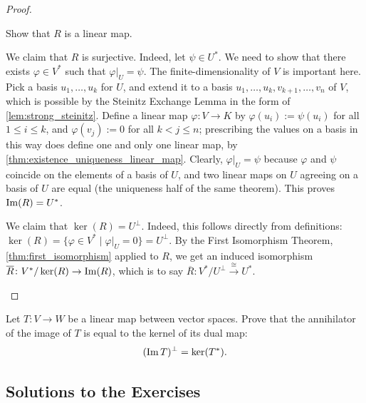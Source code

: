 \begin{proof}
\begin{enumerate}
    \begin{exercise}
      \label{exc:restriction_linear}
      Show that $R$ is a linear map.
\end{exercise}

    We claim that $R$ is surjective. Indeed, let $\psi \in U^*$. We need to show that there exists $\varphi \in V^*$ such that $\varphi|_U = \psi$. The finite-dimensionality of $V$ is important here. Pick a basis $u_1, \dots, u_k$ for $U$, and extend it to a basis $u_1, \dots, u_k, v_{k+1}, \dots, v_n$ of $V$, which is possible by the Steinitz Exchange Lemma in the form of \cref{lem:strong_steinitz}. Define a linear map $\varphi \colon V \to K$ by $\varphi(u_i) := \psi(u_i)$ for all $1 \leq i \leq k$, and $\varphi(v_j) := 0$ for all $k < j \leq n$; prescribing the values on a basis in this way does define one and only one linear map, by \cref{thm:existence_uniqueness_linear_map}. Clearly, $\varphi|_U = \psi$ because $\varphi$ and $\psi$ coincide on the elements of a basis of $U$, and two linear maps on $U$ agreeing on a basis of $U$ are equal (the uniqueness half of the same theorem). This proves $\operatorname{Im}(R) = U^*$.

    We claim that $\ker(R) = U^\perp$. Indeed, this follows directly from definitions: $\ker(R) = \{\varphi \in V^* \mid \varphi|_U = 0\} = U^\perp$.
    By the First Isomorphism Theorem, \cref{thm:first_isomorphism} applied to $R$, we get an induced isomorphism $\overline{R} \colon V^*/\ker(R) \to \operatorname{Im}(R)$, which is to say $\overline{R} \colon V^*/U^\perp \xrightarrow{\cong} U^*$.
  \end{enumerate}
\end{proof}

\begin{exercise}
  \label{exc:annihilator_image_kernel_dual}
  Let $T \colon V \to W$ be a linear map between vector spaces. Prove that the annihilator of the image of $T$ is equal to the kernel of its dual map:
  \[ (\operatorname{Im} T)^\perp = \ker(T^*). \]
\end{exercise}

\subsection{Solutions to the Exercises}
\label{sec:solutions_quotients}

